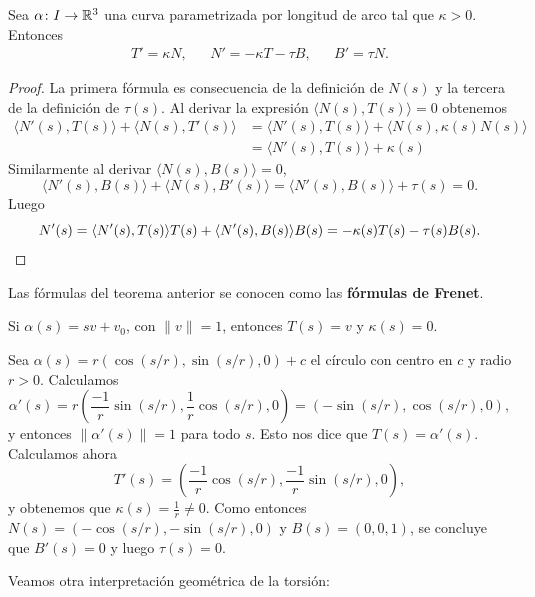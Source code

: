 \begin{theorem}
	Sea $\alpha\colon I\to\mathbb{R}^3$ una curva parametrizada por longitud de arco
	tal que $\kappa>0$. Entonces
	\begin{align*}
		T'=\kappa N, && 
		N'=-\kappa T-\tau B, && 
		B'=\tau N.
	\end{align*}
\end{theorem}

\begin{proof}
	La primera fórmula es consecuencia de la definición de 
	$N(s)$ y la tercera de la definición de $\tau(s)$. Al derivar
	la expresión
	$\langle N(s),T(s)\rangle=0$ 
	obtenemos
	\begin{align*}
		\langle N'(s),T(s)\rangle+\langle N(s),T'(s)\rangle
		&=\langle N'(s),T(s)\rangle+\langle N(s),\kappa(s)N(s)\rangle\\
		&=\langle N'(s),T(s)\rangle+\kappa(s)
	\end{align*}
	Similarmente al derivar $\langle N(s),B(s)\rangle=0$, 
	\[
		\langle N'(s),B(s)\rangle+\langle N(s),B'(s)\rangle=\langle N'(s),B(s)\rangle+\tau(s)=0.
	\]
	Luego 
	\[
	N'(s)=\langle N'(s),T(s)\rangle T(s)+\langle N'(s),B(s)\rangle B(s)=-\kappa(s)T(s)-\tau(s)B(s).\qedhere
	\]
\end{proof}

Las fórmulas del teorema anterior se conocen como las \textbf{fórmulas de Frenet}.

\begin{example}
	Si $\alpha(s)=sv+v_0$, con $\|v\|=1$, entonces $T(s)=v$ y $\kappa(s)=0$.
\end{example}

\begin{example}
	Sea $\alpha(s)=r\left(\cos(s/r),\sin(s/r),0\right)+c$ el círculo con centro en $c$ y radio $r>0$. 
	Calculamos
	\[
		\alpha'(s)=r\left(\frac{-1}{r}\sin(s/r),\frac{1}{r}\cos(s/r),0\right)=(-\sin(s/r),\cos(s/r),0),
	\]
	y entonces $\|\alpha'(s)\|=1$ para todo $s$. Esto nos dice que $T(s)=\alpha'(s)$. Calculamos ahora
	\[
		T'(s)=\left(\frac{-1}{r}\cos(s/r),\frac{-1}{r}\sin(s/r),0\right),
	\]
	y obtenemos que $\kappa(s)=\frac{1}{r}\ne0$. Como entonces
	$N(s)=(-\cos(s/r),-\sin(s/r),0)$ y $B(s)=(0,0,1)$, se concluye que
	$B'(s)=0$ y luego $\tau(s)=0$.
\end{example}

Veamos otra interpretación geométrica de la torsión:

